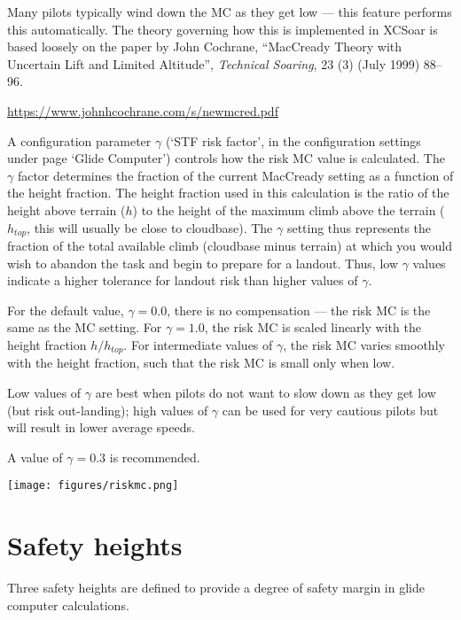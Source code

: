   Many pilots typically wind down the MC as they get low --- this
  feature performs this automatically.  The theory governing how this
  is implemented in XCSoar is based loosely on the paper by John
  Cochrane, ``MacCready Theory with Uncertain Lift and Limited
  Altitude'', \emph{Technical Soaring}, 23 (3) (July 1999) 88--96.

\url{https://www.johnhcochrane.com/s/newmcred.pdf}

  A configuration parameter $\gamma$ (`STF risk factor', in the
  configuration settings under page `Glide Computer') controls how the
  risk MC value is calculated.  The $\gamma$ factor determines the
  fraction of the current MacCready setting as a function of the
  height fraction.  The height fraction used in this calculation is
  the ratio of the height above terrain ($h$) to the height of the
  maximum climb above the
  terrain ($h_{top}$, this will usually be close to cloudbase).
  The $\gamma$ setting thus represents the
  fraction of the total available climb (cloudbase minus terrain) at
  which you would wish to abandon the task and begin to prepare for a
  landout.  Thus, low $\gamma$ values indicate a higher tolerance for
  landout risk than higher values of $\gamma$.

  For the default value, $\gamma=0.0$, there is no compensation ---
  the risk MC is the same as the MC setting.  For $\gamma=1.0$, the
  risk MC is scaled linearly with the height fraction $h/h_{top}$.
  For intermediate values of $\gamma$, the risk MC varies smoothly
  with the height fraction, such that the risk MC is small only when
  low.

  Low values of $\gamma$ are best when pilots do not want to slow down
  as they get low (but risk out-landing); high values of $\gamma$ can
  be used for very cautious pilots but will result in lower average
  speeds.

  A value of $\gamma=0.3$ is recommended.

\begin{center}
\texttt{[image: figures/riskmc.png]}
\end{center}


\section{Safety heights}\label{sec:safety-heights}

Three safety heights are defined to provide a degree of safety margin
in glide computer calculations.  

